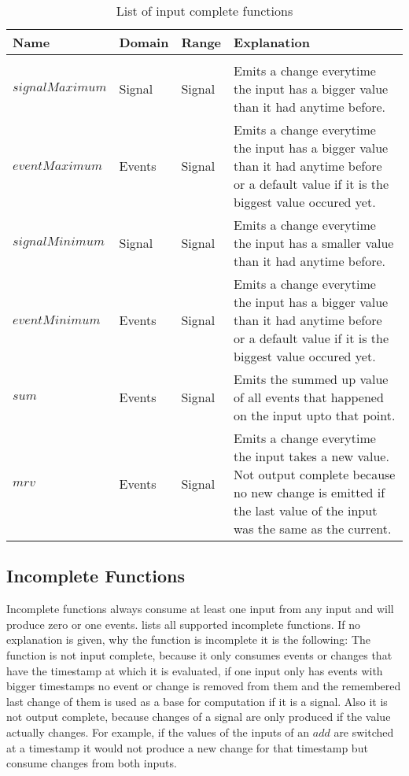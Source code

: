 \begin{table}[!htb]
  \begin{tabularx}{\textwidth}{lllX}
    Name                 & Domain  & Range   & Explanation \\
    \toprule \\
    \(\mathit{signalMaximum}\)    & Signal  & Signal  & Emits a change everytime the input has a bigger value than it had anytime before. \\
    \(\mathit{eventMaximum}\)     & Events  & Signal  & Emits a change everytime the input has a bigger value than it had anytime before or a default value if it is the biggest value occured yet. \\
    \(\mathit{signalMinimum}\)    & Signal  & Signal  & Emits a change everytime the input has a smaller value than it had anytime before. \\
    \(\mathit{eventMinimum}\)     & Events  & Signal  & Emits a change everytime the input has a bigger value than it had anytime before or a default value if it is the biggest value occured yet. \\
    \(\mathit{sum}\)              & Events  & Signal  & Emits the summed up value of all events that happened on the input upto that point. \\
    \(\mathit{mrv}\)              & Events  & Signal  & Emits a change everytime the input takes a new value. Not output complete because no new change is emitted if the last value of the input was the same as the current.
  \end{tabularx}
\caption{List of input complete functions}
\label{table:input_complete_functions}
\end{table}


\subsection{Incomplete Functions}
\label{sec:definitions:tessla_functions:incomplete}
Incomplete functions always consume at least one input from any input and will produce zero or one events.
 lists all supported incomplete functions.
If no explanation is given, why the function is incomplete it is the following:
The function is not input complete, because it only consumes events or changes that have the timestamp at which it is evaluated, if one input only has events with bigger timestamps no event or change is removed from them and the remembered last change of them is used as a base for computation if it is a signal.
Also it is not output complete, because changes of a signal are only produced if the value actually changes.
For example, if the values of the inputs of an \(\mathit{add}\) are switched at a timestamp it would not produce a new change for that timestamp but consume changes from both inputs.

